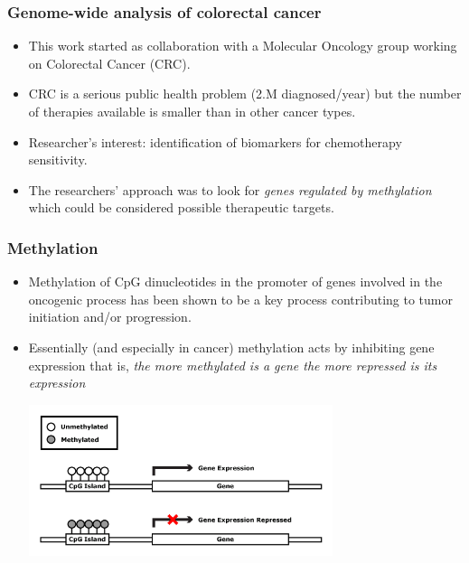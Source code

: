 \documentclass[handout]{beamer}
\begin{document}
\begin{frame}
	\frametitle{Genome-wide analysis of colorectal cancer}
	  \begin{itemize}
	  	\item This work started as collaboration with a Molecular Oncology group working on Colorectal Cancer (CRC).
	  	\item CRC is a serious public health problem (2.M diagnosed/year) but the number of therapies available is smaller than in other cancer types.
	  	\item Researcher's interest: identification of biomarkers for chemotherapy sensitivity.
	  	\item The researchers' approach was to look for \textit{genes regulated by methylation} which could be considered possible therapeutic targets.
	  	\end{itemize}
\end{frame}

\begin{frame}
	\frametitle{Methylation}
	\begin{itemize}
		\item Methylation of CpG dinucleotides in the promoter of genes
		involved in the oncogenic process has been shown to be a key process
		contributing to tumor initiation and/or progression.
		\item Essentially (and especially in cancer) methylation acts by inhibiting gene expression that
		is,\emph{ the more methylated is a gene the more repressed is its expression}
		\begin{center}
			\includegraphics[width=0.7\textwidth]{./images/methylationAction1.png}
		\end{center}
	\end{itemize}
\end{frame}
\end{document}
